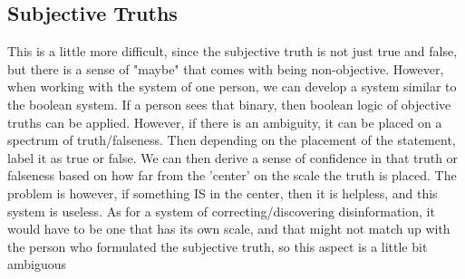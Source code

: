 \documentclass[12pt]{article}
\begin{document}
\subsection{Subjective Truths}
This is a little more difficult, since the subjective truth is not just true and false, but there is a sense of "maybe" that comes with being non-objective. However, when working with the system of one person, we can develop a system similar to the boolean system. If a person sees that binary, then boolean logic of objective truths can be applied. However, if there is an ambiguity, it can be placed on a spectrum of truth/falseness. Then depending on the placement of the statement, label it as true or false. We can then derive a sense of confidence in that truth or falseness based on how far from the 'center' on the scale the truth is placed. The problem is however, if something IS in the center, then it is helpless, and this system is useless. As for a system of correcting/discovering disinformation, it would have to be one that has its own scale, and that might not match up with the person who formulated the subjective truth, so this aspect is a little bit ambiguous
\end{document}

